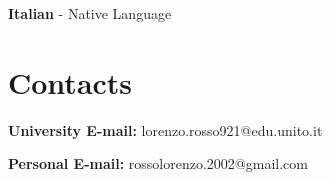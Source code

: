\documentclass[10pt,a4paper]{article}
\begin{document}
\par

\textbf{Italian}
{\small
- Native Language
}


\section*{Contacts}
\vspace{6pt}
\par \textbf{University E-mail:} \small lorenzo.rosso921@edu.unito.it
\par \textbf{Personal E-mail:} \small rossolorenzo.2002@gmail.com
\end{document}
